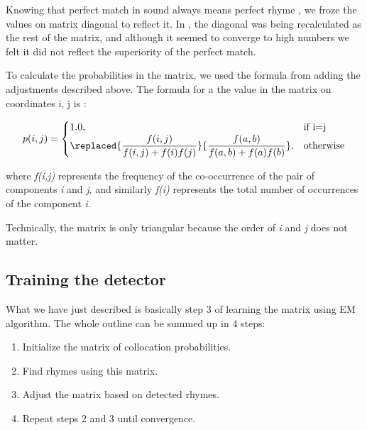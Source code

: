 Knowing that perfect match in sound always means perfect rhyme , we froze the values on matrix diagonal to reflect it. In \cite{plechavc2018collocation}, the diagonal was being recalculated as the rest of the matrix, and although it seemed to converge to high numbers we felt it did not reflect the superiority of the perfect match.

To calculate the probabilities in the matrix, we used the formula from \cite{plechavc2018collocation} adding the adjustments described above. The formula for a the value in the matrix on coordinates i, j is : 


	    \[ p(i,j) = \begin{cases} 
	    \mbox{1.0,} & \mbox{if  i=j} \\ 
	  \replaced{\dfrac{f(i,j)}{f(i,j) + f(i)f(j)}}{\dfrac{f(a,b)}{f(a,b) + f(a)f(b)}},
	     & \mbox{otherwise} \\
	    \end{cases} \]

where\textit{ f(i,j)} represents the frequency of the co-occurrence of the pair of components \textit{i} and \textit{j}, and similarly \textit{f(i)} represents the total number of occurrences of the component \textit{i}.

Technically, the matrix is only triangular because the order of \textit{i} and \textit{j} does not matter.

\subsection{Training the detector}
What we have just described is basically step 3 of learning the matrix using EM algorithm. The whole outline can be summed up in 4 steps:
\begin{enumerate}
	\item Initialize the matrix of collocation probabilities.
	\item Find rhymes using this matrix.
	\item Adjust the matrix based on detected rhymes.
	\item Repeat steps 2 and 3 until convergence.
\end{enumerate} 

